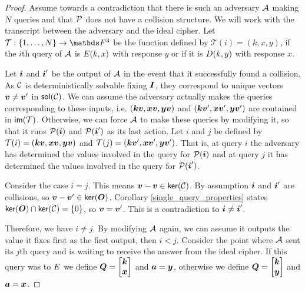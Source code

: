 \begin{proof}
    Assume towards a contradiction that there is such an adversary $\A$ making $N$ queries
    and that $\P$ does not have a collision structure.
    We will work with the transcript between the adversary and the ideal cipher.
    Let $\mathcal{T}: \{1, \dots, N\} \to \F^3$ be the function defined by $\mathcal{T}(i) = (k, x, y)$,
    if the $i$th query of $\A$ is $\E(k, x)$ with response $y$ or if it is $\D(k, y)$ with response $x$.

    Let $\v i$ and $\v i'$ be the output of $\A$ in the event that it successfully found a collision.
    As $\C$ is deterministically solvable fixing $\I$, they correspond to unique vectors $\vv \neq \vv'$ in $\sol(\C)$.
    We can assume the adversary actually makes the queries corresponding to these inputs,
    i.e. $(\vk \vv, \vx \vv, \vy \vv)$ and $(\vk \vv', \vx \vv', \vy \vv')$ are contained in $\im(\mathcal{T})$.
    Otherwise, we can force $\A$ to make these queries by modifying it,
    so that it runs $\P(\v i)$ and $\P(\v i')$ as its last action.
    Let $i$ and $j$ be defined by $\mathcal{T}(i) = (\vk \vv, \vx \vv, \vy \vv)$
    and $\mathcal{T}(j) = (\vk \vv', \vx \vv', \vy \vv')$. 
    That is, at query $i$ the adversary has determined the values involved in the query for $\P(\v i)$ and
    at query $j$ it has determined the values involved in the query for $\P(\v i')$.
    
    Consider the case $i = j$.
    This means $\vv - \vv \in \ker(\C)$.
    By assumption $\v i$ and $\v i'$ are collisions, so $\vv - \vv' \in \ker(\O)$.
    Corollary \ref{single_query_properties} states $\ker(\O) \cap \ker(\C) = \{0\}$,
    so $\vv = \vv'$. 
    This is a contradiction to $\v i \neq \v i'$.
    
    Therefore, we have $i \neq j$.
    By modifying $\A$ again,
    we can assume it outputs the value it fixes first as the first output, then $i < j$.
    Consider the point where $\A$ sent its $j$th query and is waiting to receive the answer from the ideal cipher.
    If this query was to $\E$ we define $\Q = \m{\vk \\ \vx}$ and $\va = \vy$,
    otherwise we define $\Q = \m{\vk \\ \vy}$ and $\va = \vx$.
    

\end{proof}
